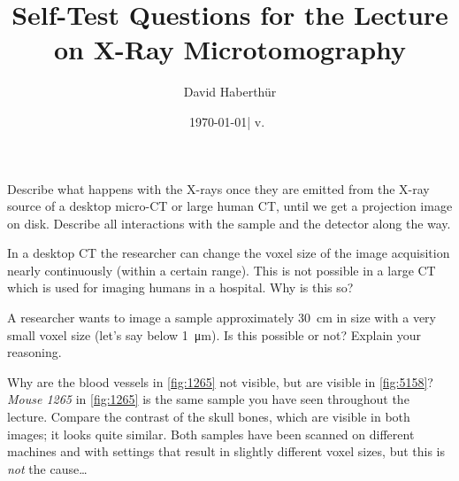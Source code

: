 \documentclass[a4paper]{exam}
\title{Self-Test Questions for the Lecture on X-Ray Microtomography}
\author{David Haberthür}
\date{\today\xspace| v.~\gitAbbrevHash}
\newcommand{\uct}{{\textmu}CT\xspace}%
\newcommand{\mct}{micro-CT\xspace}%
\begin{document}
\maketitle

\begin{questions}

    \question Describe what happens with the X-rays once they are emitted from the X-ray source of a desktop \mct or large human CT\@, until we get a projection image on disk.
    Describe all interactions with the sample and the detector along the way.

    \question In a desktop \uct the researcher can change the voxel size of the image acquisition nearly continuously (within a certain range).
    This is not possible in a large CT which is used for imaging humans in a hospital.
    Why is this so?

    \question A researcher wants to image a sample approximately \qty{30}{\centi\meter} in size with a very small voxel size (let's say below \qty{1}{\micro\meter}).
    Is this possible or not?
    Explain your reasoning.

    \question Why are the blood vessels in \autoref{fig:1265} not visible, but are visible in \autoref{fig:5158}?
    \emph{Mouse 1265} in \autoref{fig:1265} is the same sample you have seen throughout the lecture.
    Compare the contrast of the skull bones, which are visible in both images; it looks quite similar.
    Both samples have been scanned on different machines and with settings that result in slightly different voxel sizes, but this is \emph{not} the cause\ldots


\end{questions}
\end{document}
